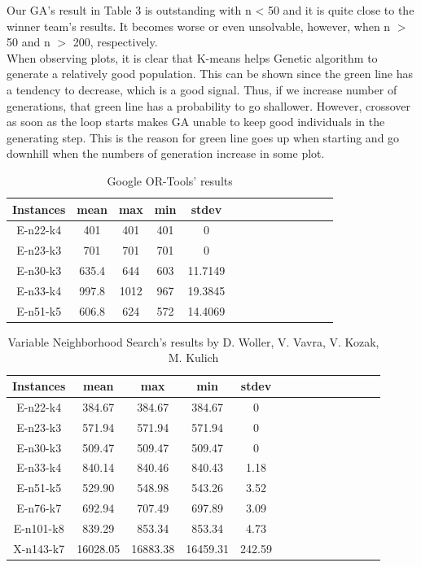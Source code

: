 \documentclass[conference,compsoc]{IEEEtran}
\begin{document}
Our GA's result in Table 3 is outstanding with n < 50 and it is quite close to the winner team's results. It becomes worse or even unsolvable, however, when n $>$ 50 and n $>$ 200, respectively.\\

When observing plots, it is clear that K-means helps Genetic algorithm to generate a relatively good population. This can be shown since the green line has a tendency to decrease, which is a good signal. Thus, if we increase number of generations, that green line has a probability to go shallower. However, crossover as soon as the loop starts makes GA unable to keep good individuals in the generating step. This is the reason for green line goes up when starting and go downhill when the numbers of generation increase in some plot.
\begin{table}[h!]
\centering
\begin{tabular}{|c|c|c|c|c|c|c|c|c|c|c|c|c|c|}
     \hline 
     Instances & mean & max & min & stdev \\
     \hline
     E-n22-k4 & 401 & 401 & 401 & 0\\
     \hline
     E-n23-k3 & 701&701 & 701&0 \\
    \hline
     E-n30-k3 & 635.4 & 644 & 603 & 11.7149\\
     \hline
     E-n33-k4 & 997.8 & 1012 & 967 & 19.3845\\
     \hline
     E-n51-k5 & 606.8&624 & 572&14.4069 \\
    \hline
\end{tabular}

\caption{Google OR-Tools' results}
\end{table}

\begin{table}[h!]
    \centering
\begin{tabular}{|c|c|c|c|c|c|c|c|c|c|c|c|c|c|}
     \hline 
     Instances & mean & max & min & stdev \\
     \hline
     E-n22-k4 & 384.67 & 384.67 & 384.67 & 0\\
     \hline
     E-n23-k3 & 571.94 & 571.94 &571.94 &0 \\
    \hline
     E-n30-k3 & 509.47 & 509.47 & 509.47 & 0\\
     \hline
     E-n33-k4 & 840.14 & 840.46 & 840.43 & 1.18\\
     \hline
     E-n51-k5 & 529.90 & 548.98 & 543.26 & 3.52\\
    \hline
    E-n76-k7 & 692.94 & 707.49 & 697.89 & 3.09\\
    \hline
    E-n101-k8 & 839.29 & 853.34&853.34 &4.73 \\
    \hline
    X-n143-k7 &16028.05 &16883.38 &16459.31 & 242.59\\
    \hline
\end{tabular}
    \caption{Variable Neighborhood Search’s results by D. Woller, V. Vavra, V. Kozak, M. Kulich}
    \label{tab:my_label}
\end{table}
\end{document}
